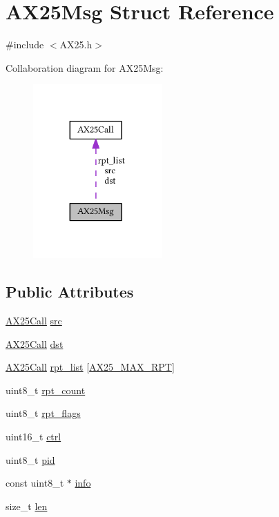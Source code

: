 \hypertarget{struct_a_x25_msg}{}\section{A\+X25\+Msg Struct Reference}
\label{struct_a_x25_msg}


{\ttfamily \#include $<$A\+X25.\+h$>$}



Collaboration diagram for A\+X25\+Msg\+:
\nopagebreak
\begin{figure}[H]
\begin{center}
\leavevmode
\includegraphics[width=140pt]{struct_a_x25_msg__coll__graph}
\end{center}
\end{figure}
\subsection*{Public Attributes}
\begin{DoxyCompactItemize}
\item 
\hyperlink{struct_a_x25_call}{A\+X25\+Call} \hyperlink{struct_a_x25_msg_a1f0571ab6f708e1725ad9a8be8e6b28a}{src}
\item 
\hyperlink{struct_a_x25_call}{A\+X25\+Call} \hyperlink{struct_a_x25_msg_a38dc18966290b4f8cb24651e9e75ef66}{dst}
\item 
\hyperlink{struct_a_x25_call}{A\+X25\+Call} \hyperlink{struct_a_x25_msg_aca3c075fa9ad0af3cea5c850153e7b83}{rpt\+\_\+list} \mbox{[}\hyperlink{_a_x25_8h_aca2813d00ec3666b450f4de16c225d38}{A\+X25\+\_\+\+M\+A\+X\+\_\+\+R\+PT}\mbox{]}
\item 
uint8\+\_\+t \hyperlink{struct_a_x25_msg_ab4a4b29611190548f3cba0c0f4969f24}{rpt\+\_\+count}
\item 
uint8\+\_\+t \hyperlink{struct_a_x25_msg_a7d77c823411d1c0eded96c29ca7586a5}{rpt\+\_\+flags}
\item 
uint16\+\_\+t \hyperlink{struct_a_x25_msg_a375105fdcb83cb525082d8dbc22c2d33}{ctrl}
\item 
uint8\+\_\+t \hyperlink{struct_a_x25_msg_ae2e8532da38c1a6fac980377ab9b494b}{pid}
\item 
const uint8\+\_\+t $\ast$ \hyperlink{struct_a_x25_msg_ac2aec986679b69baa42af40caf9a48bd}{info}
\item 
size\+\_\+t \hyperlink{struct_a_x25_msg_a45b0f4c6c77aec02cd647b51e0f736e1}{len}
\end{DoxyCompactItemize}


